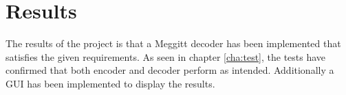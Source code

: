 \documentclass[Main]{subfiles}
\begin{document}
\chapter{Results}
The results of the project is that a Meggitt decoder has been implemented that satisfies the given requirements. As seen in chapter \ref{cha:test}, the tests have confirmed that both encoder and decoder perform as intended. Additionally a GUI has been implemented to display the results.  
\end{document}
